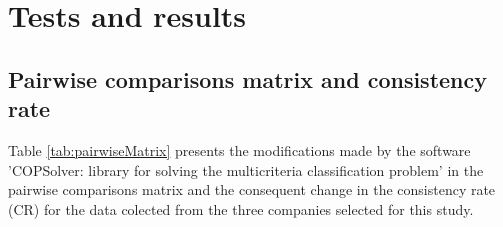 \documentclass[authoryear,manuscript,12pt]{elsarticle}
\begin{document}
\section{Tests and results}
\label{sec:results}

\subsection{Pairwise comparisons matrix and consistency rate}

Table \ref{tab:pairwiseMatrix} presents the modifications made by the software 'COPSolver: library for solving the multicriteria classification problem' in the pairwise comparisons matrix and the consequent change in the consistency rate (CR) for the data colected from the three companies selected for this study.
\end{document}
